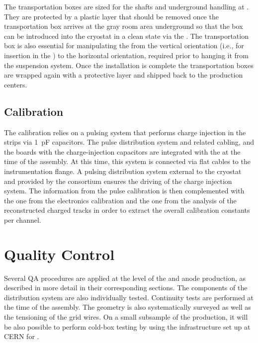The transportation boxes are sized for the shafts and underground handling at \surf{}.
They are protected by a plastic layer that should be removed once the transportation box arrives at the gray room area 
underground so that the box can be introduced into the cryostat in a clean state via the . The transportation box is also essential for manipulating the  from the vertical orientation (i.e., for insertion in the ) to the horizontal orientation, required %
 prior to hanging it from the suspension system. Once the installation is complete the transportation boxes are wrapped again with a protective layer and shipped back to the production centers. 

\subsection{Calibration}
\label{sec:fddp-crp-install-calib}

The  calibration relies on a pulsing system that performs charge injection in the strips via \SI{1}{pF} capacitors. The pulse distribution system and related cabling, and the boards with the charge-injection capacitors are integrated  with the  at the time of the  assembly. At this time, this system is connected via flat cables to the instrumentation flange. A pulsing distribution system external to the cryostat and  provided by the  consortium ensures the driving of the charge injection system. 
 The information from the pulse calibration is then complemented 
 with the one from the  electronics calibration and the one from the analysis of the reconstructed charged tracks in order to extract the overall calibration constants per channel.


\section{Quality Control}
\label{sec:fddp-crp-qc}

Several QA 
procedures are applied at the level of the  and anode production, as described in more detail in their corresponding sections. The components of the  distribution system are also individually tested. Continuity tests are performed at the time of the  assembly. The  geometry is also systematically surveyed as well as the tensioning of the grid wires. On a small subsample of the  production, it will be also possible to perform cold-box testing by using the infrastructure set up at CERN for .


